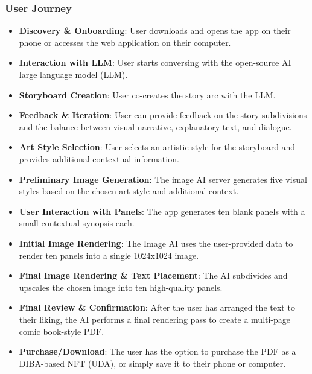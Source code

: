 \subsubsection{User Journey}
\begin{itemize}
    \item \textbf{Discovery \& Onboarding}: User downloads and opens the app on their phone or accesses the web application on their computer.
    \item \textbf{Interaction with LLM}: User starts conversing with the open-source AI large language model (LLM).
    \item \textbf{Storyboard Creation}: User co-creates the story arc with the LLM. 
    \item \textbf{Feedback \& Iteration}: User can provide feedback on the story subdivisions and the balance between visual narrative, explanatory text, and dialogue. 
    \item \textbf{Art Style Selection}: User selects an artistic style for the storyboard and provides additional contextual information.
    \item \textbf{Preliminary Image Generation}: The image AI server generates five visual styles based on the chosen art style and additional context.
    \item \textbf{User Interaction with Panels}: The app generates ten blank panels with a small contextual synopsis each.
    \item \textbf{Initial Image Rendering}: The Image AI uses the user-provided data to render ten panels into a single 1024x1024 image.
    \item \textbf{Final Image Rendering \& Text Placement}: The AI subdivides and upscales the chosen image into ten high-quality panels.
    \item \textbf{Final Review \& Confirmation}: After the user has arranged the text to their liking, the AI performs a final rendering pass to create a multi-page comic book-style PDF. 
    \item \textbf{Purchase/Download}: The user has the option to purchase the PDF as a DIBA-based NFT (UDA), or simply save it to their phone or computer.
\end{itemize}

